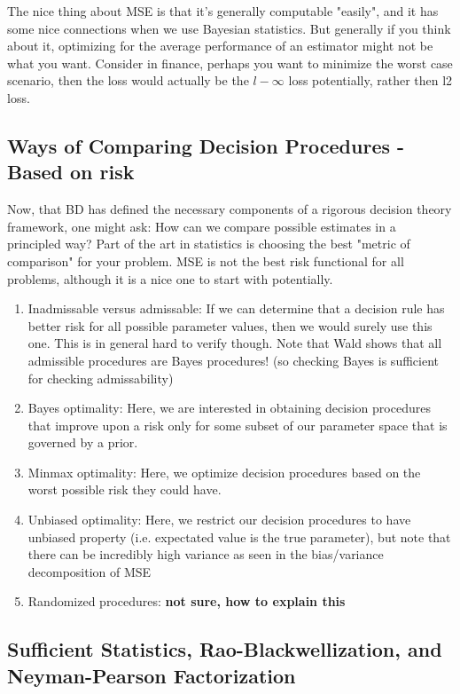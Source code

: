     The nice thing about MSE is that it's generally computable "easily", and it has some nice connections when we use Bayesian statistics. But generally if you think about it, optimizing for the average performance of an estimator might not be what you want. Consider in finance, perhaps you want to minimize the worst case scenario, then the loss would actually be the $l-\infty$ loss potentially, rather then l2 loss.

  \subsection{Ways of Comparing Decision Procedures - Based on risk}

    Now, that BD has defined the necessary components of a rigorous decision theory framework, one might ask: How can we compare possible estimates in a principled way? Part of the art in statistics is choosing the best "metric of comparison" for your problem. MSE is not the best risk functional for all problems, although it is a nice one to start with potentially.

    \begin{enumerate}
      \item Inadmissable versus admissable: If we can determine that a decision rule has better risk for all possible parameter values, then we would surely use this one. This is in general hard to verify though. Note that Wald shows that all admissible procedures are Bayes procedures! (so checking Bayes is sufficient for checking admissability)
      \item Bayes optimality: Here, we are interested in obtaining decision procedures that improve upon a risk only for some subset of our parameter space that is governed by a prior.
      \item Minmax optimality: Here, we optimize decision procedures based on the worst possible risk they could have.
      \item Unbiased optimality: Here, we restrict our decision procedures to have unbiased property (i.e. expectated value is the true parameter), but note that there can be incredibly high variance as seen in the bias/variance decomposition of MSE
      \item Randomized procedures: \textbf{not sure, how to explain this}
    \end{enumerate}

  \subsection{Sufficient Statistics, Rao-Blackwellization, and Neyman-Pearson Factorization}

